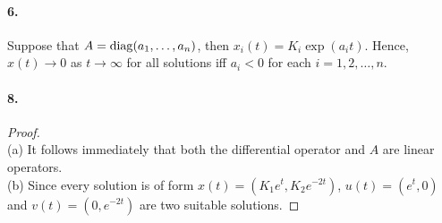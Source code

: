   \paragraph{6.}
  \begin{solution}
    Suppose that $A=\operatorname{diag}(a_1,\dots,a_n)$, then $x_i(t)=K_i\exp(a_it)$. Hence,
    $x(t)\to 0$ as $t\to\infty$ for all solutions iff $a_i<0$ for each $i=1, 2, 
    \dots,n$.
  \end{solution}

  \paragraph{8.}
  \begin{proof}
    $\,$ \\
    (a) It follows immediately that both the differential operator and $A$ are
    linear operators. \\
    (b) Since every solution is of form $x(t)=(K_1e^t, K_2e^{-2t})$, $u(t)=(e^t,
    0)$ and $v(t)=(0, e^{-2t})$ are two suitable solutions.
  \end{proof}
